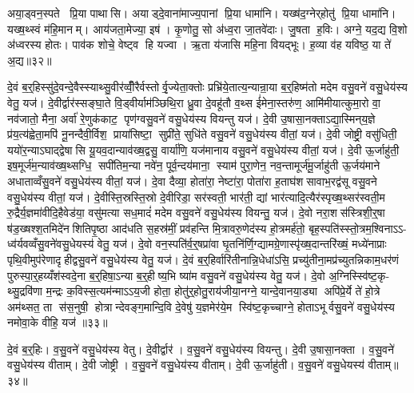 अया॒ड्वन॒स्पते प्रि॒या पाथासि। अयाड्दे॒वाना॑माज्य॒पानां प्रि॒या धामा॑नि। यख्ष॑द॒ग्नेर्‌होतु॑ प्रि॒या धामा॑नि। यख्ष॒थ्स्वं म॑हि॒मानम्। आय॑जता॒मेज्या॒ इष॑। कृ॒णोतु॒ सो अ॑ध्व॒रा जा॒तवे॑दाः। जु॒षता ह॒विः। अग्ने॒ यद॒द्य वि॒शो अ॑ध्वरस्य होतः। पाव॑क शोचे॒ वेष्ट्व हि यज्वा। ऋ॒ता य॑जासि महि॒ना वियद्भूः। ह॒व्या व॑ह यविष्ठ॒ या ते॑ अ॒द्य॥३२॥\anuvakamend[धामा॑नि॒ भूरेक॑ञ्च]

दे॒वं ब॒र्॒हिस्सु॑दे॒वन्दे॒वैस्स्याथ्सु॒वीर॑व्वीँ॒रैर्वस्तोर्वृ॒ज्येता॒क्तोः प्रभ्रि॑ये॒तात्य॒न्यान्रा॒या ब॒र्॒हिष्म॑तो मदेम वसु॒वने॑ वसु॒धेय॑स्य वेतु॒ यज॑। दे॒वीर्द्वार॑स्सङ्घा॒ते वि॒ड्वीर्याम॑ञ्छिथि॒रा ध्रु॒वा दे॒वहू॑तौ व॒थ्स ई॑मेना॒स्तरु॑ण॒ आमि॑मीयात्कुमा॒रो वा॒ नव॑जातो॒ मैना॒ अर्वा॑ रे॒णुक॑काट॒ पृण॑ग्वसु॒वने॑ वसु॒धेय॑स्य वियन्तु यज॑। दे॒वी उ॒षासा॒नक्ताऽद्या॒स्मिन्‌य॒ज्ञे प्र॑य॒त्य॑ह्वेता॒मपि॑ नू॒नन्दैवी॒र्विश॒ प्राया॑सिष्टा॒ सुप्री॑ते॒ सुधि॑ते वसु॒वने॑ वसु॒धेय॑स्य वीतां॒ यज॑। दे॒वी जोष्ट्री॒ वसु॑धिती॒ ययो॑र॒न्याऽघाद्द्वेषासि यू॒यव॒दान्याव॑ख्ष॒द्वसु॒ वार्या॑णि॒ यज॑मानाय वसु॒वने॑ वसु॒धेय॑स्य वीतां॒ यज॑। दे॒वी ऊ॒र्जाहु॑ती॒ इष॒मूर्ज॑म॒न्याव॑ख्ष॒थ्सग्धि॒ सपी॑तिम॒न्या नवे॑न॒ पूर्व॒न्दय॑माना॒ स्याम॑ पुरा॒णेन॒ नव॒न्तामूर्ज॑मू॒र्जाहु॑ती ऊ॒र्जय॑माने अधाताव्वँसु॒वने॑ वसु॒धेय॑स्य वीतां॒ यज॑। दे॒वा दैव्या॒ होता॑रा॒ नेष्टा॑रा॒ पोता॑रा ह॒ताघ॑शसावाभ॒रद्व॑सू वसु॒वने वसु॒धेय॑स्य वीतां॒ यज॑। दे॒वीस्ति॒स्रस्ति॒स्रो दे॒वीरिडा॒ सर॑स्वती॒ भार॑ती॒ द्यां भार॑त्यादि॒त्यैर॑स्पृख्ष॒थ्सर॑स्वती॒म रु॒द्रैर्य॒ज्ञमा॑वीदि॒हैवेड॑या॒ वसु॑मत्या सध॒मादं॑ मदेम वसु॒वने॑ वसु॒धेय॑स्य वियन्तु॒ यज॑। दे॒वो नरा॒शस॑स्त्रिशी॒र्॒षा ष॑ड॒ख्षश्श॒तमिदे॑नशितिपृ॒ष्ठा आद॑धति स॒हस्र॑मीं॒ प्रव॑हन्ति मि॒त्रावरु॒णेद॑स्य हो॒त्रमर्\mbox{}ह॑तो॒ बृह॒स्पति॑स्स्तो॒त्रम॒श्विनाऽऽ- ध्व॑र्यवव्वँसु॒वने॑वसु॒धेयस्य॑ वेतु॒ यज॑। दे॒वो वन॒स्पति॑र्व॒र्॒षप्रा॑वा घृ॒तनि॑र्णि॒ग्द्यामग्रे॒णास्पृ॑ख्ष॒दान्तरि॑ख्षं॒ मध्ये॑नाप्राः पृथि॒वीमुप॑रेणादृहीद्वसु॒वने॑ वसु॒धेय॑स्य वेतु॒ यज॑। दे॒वं ब॒र्॒हिर्वारि॑तीनान्नि॒धेधा॑ऽसि॒ प्रच्यु॑तीना॒मप्र॑च्युतन्निकाम॒धर॑णं पुरुस्पा॒र्॒हय्यँश॑स्वदे॒ना ब॒र्॒हिषा॒ऽन्या ब॒र्॒हीष्य॒भि ष्या॑म वसु॒वने॑ वसु॒धेय॑स्य वेतु॒ यज॑। दे॒वो अ॒ग्निस्स्वि॑ष्ट॒कृ- थ्सु॒द्रवि॑णा म॒न्द्रः क॒विस्स॒त्यम॑न्माऽऽय॒जी होता॒ होतु॑र्॒होतु॒राय॑जीया॒नग्ने॒ यान्दे॒वानया॒ड्या अपि॑प्रे॒र्ये ते॑ हो॒त्रे अम॑थ्सत॒ ता स॑स॒नुषी॒ होत्रान्देवङ्ग॒मान्दि॒वि दे॒वेषु॑ य॒ज्ञमेर॑ये॒म स्वि॑ष्ट॒कृच्चाग्ने॒ होताऽभूर्वसु॒वने॑ वसु॒धेय॑स्य नमोवा॒के वीहि॒ यज॑ ॥३३॥\anuvakamend[यजैक॑ञ्च]

दे॒वं ब॒र्॒हिः। व॒सु॒वने॑ वसु॒धेय॑स्य वेतु। दे॒वीर्द्वार॑। व॒सु॒वने॑ वसु॒धेय॑स्य वियन्तु। दे॒वी उ॒षासा॒नक्ता। व॒सु॒वने॑ वसु॒धेय॑स्य वीताम्। दे॒वी जोष्ट्री। व॒सु॒वने॑ वसु॒धेय॑स्य वीताम्। दे॒वी ऊ॒र्जाहु॑ती। व॒सु॒वने॑ वसु॒धेयस्य॑ वीताम्॥३४॥

